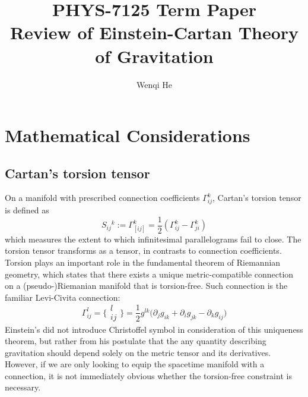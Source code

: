 \documentclass[12pt]{article}
\title{PHYS-7125 Term Paper \\ Review of Einstein-Cartan Theory of Gravitation}
\author{Wenqi He}
\begin{document}
\maketitle
\section{Mathematical Considerations}
\subsection{Cartan's torsion tensor}
On a manifold with prescribed connection coefficients $\Gamma^k_{ij}$, Cartan's torsion tensor is defined as
\[ S_{ij}{}^k := \Gamma^k_{[ij]} = \frac{1}{2}(\Gamma^k_{ij} - \Gamma^k_{ji})\]
which measures the extent to which infinitesimal parallelograms fail to close. The torsion tensor transforms as a tensor, in contrasts to connection coefficients. Torsion plays an important role in the fundamental theorem of Riemannian geometry, which states that there exists a unique metric-compatible connection on a (pseudo-)Riemanian manifold that is torsion-free. Such connection is the familiar Levi-Civita connection:
\[ \Gamma^l_{ij} = \{\substack{l\\ij}\} = \frac{1}{2}g^{lk}\Big(\partial_j g_{ik} + \partial_i g_{jk} - \partial_k g_{ij} \Big)\]
Einstein's did not introduce Christoffel symbol in consideration of this uniqueness theorem, but rather from his postulate that the any quantity describing gravitation should depend solely on the metric tensor and its derivatives. However, if we are only looking to equip the spacetime manifold with a connection, it is not immediately obvious whether the torsion-free constraint is necessary. 
\end{document}
